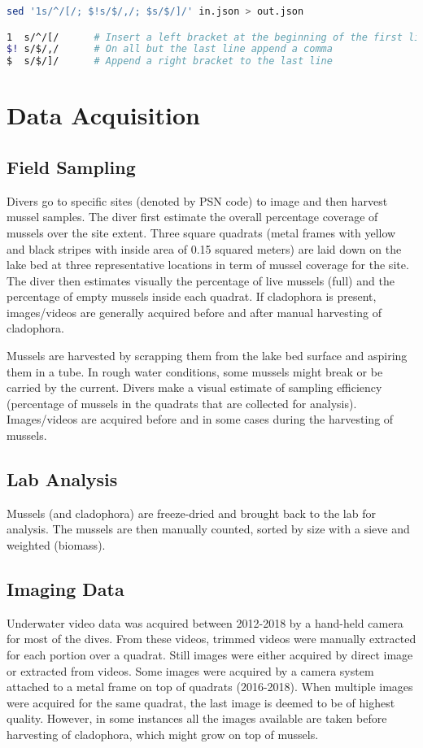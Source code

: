 \documentclass[11pt]{article} %
\begin{document}
\begin{lstlisting}[language=bash, frame=single]
sed '1s/^/[/; $!s/$/,/; $s/$/]/' in.json > out.json

1  s/^/[/      # Insert a left bracket at the beginning of the first line
$! s/$/,/      # On all but the last line append a comma
$  s/$/]/      # Append a right bracket to the last line
\end{lstlisting}

\section{Data Acquisition}

\subsection{Field Sampling}

Divers go to specific sites (denoted by PSN code) to image and then harvest mussel samples. The diver first estimate the overall percentage coverage of mussels over the site extent. Three square quadrats (metal frames with yellow and black stripes with inside area of 0.15 squared meters) are laid down on the lake bed at three representative locations in term of mussel coverage for the site. The diver then estimates visually the percentage of live mussels (full) and the percentage of empty mussels inside each quadrat. If cladophora is present, images/videos are generally acquired before and after manual harvesting of cladophora.

Mussels are harvested by scrapping them from the lake bed surface and aspiring them in a tube. In rough water conditions, some mussels might break or be carried by the current. Divers make a visual estimate of sampling efficiency (percentage of mussels in the quadrats that are collected for analysis). Images/videos are acquired before and in some cases during the harvesting of mussels.

\subsection{Lab Analysis}
Mussels (and cladophora) are freeze-dried and brought back to the lab for analysis. The mussels are then manually counted, sorted by size with a sieve and weighted (biomass).

\subsection{Imaging Data}
Underwater video data was acquired between 2012-2018 by a hand-held camera for most of the dives. From these videos, trimmed videos were manually extracted for each portion over a quadrat. Still images were either acquired by direct image or extracted from videos. Some images were acquired by a camera system attached to a metal frame on top of quadrats (2016-2018). When multiple images were acquired for the same quadrat, the last image is deemed to be of highest quality. However, in some instances all the images available are taken before harvesting of cladophora, which might grow on top of mussels.
\end{document}
